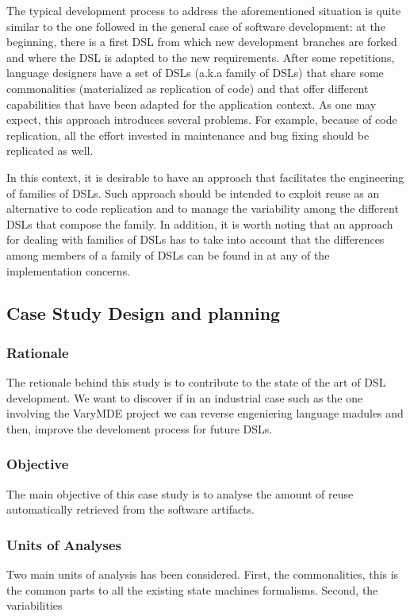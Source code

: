The typical development process to address the aforementioned situation is quite similar to the one followed in the
general case of software development: at the beginning, there is a first DSL from which new development branches are forked and where the DSL is adapted to the new requirements. After some repetitions, language designers have a set of DSLs (a.k.a family of DSLs) that share some commonalities (materialized as replication of code) and that offer different capabilities that have been adapted for the application context. As one may expect, this approach introduces several problems. For example, because of code replication, all the effort invested in maintenance and bug fixing should be replicated as well.

In this context, it is desirable to have an approach that facilitates the engineering of families of DSLs. Such approach should be intended to exploit reuse as an alternative to code replication and to manage the variability among the different DSLs that compose the family. In addition, it is worth noting that an approach for dealing with families of DSLs has to take into account that the differences among members of a family of DSLs can be found in at any of the implementation concerns.


\subsection{Case Study Design and planning}
\subsubsection{Rationale}
The retionale behind this study is to contribute to the state of the art of DSL development. We want to discover if in an industrial case such as the one involving the VaryMDE project we can reverse engeniering language madules and then, improve the develoment process for future DSLs.

\subsubsection{Objective}
The main objective of this case study is to analyse the amount of reuse automatically retrieved from the software artifacts.
\subsubsection{Units of Analyses}
Two main units of analysis has been considered. First, the commonalities, this is the common parts to all the existing state machines formalisms. Second, the variabilities



